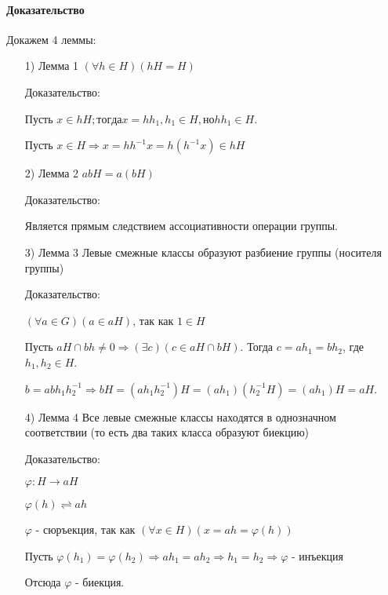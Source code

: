 \documentclass{report}
\begin{document}
\paragraph*{Доказательство}
Докажем 4 леммы:
\begin{itemize}
    \item[1)] Лемма 1\newline
        $(\forall h \in H)(hH = H)$

        Доказательство:

        Пусть $x \in hH; тогда x = hh_1, h_1 \in H, но hh_1 \in H$.

        Пусть $x \in H \Rightarrow x = hh^{-1}x = h(h^{-1}x) \in hH$
    \item[2)] Лемма 2\newline
        $abH = a(bH)$

        Доказательство:

        Является прямым следствием ассоциативности операции группы.
    \item[3)] Лемма 3\newline
        Левые смежные классы образуют разбиение группы (носителя группы)

        Доказательство:

        $(\forall a \in G)(a \in aH)$, так как $1 \in H$

        Пусть $aH \cap bh \neq 0 \Rightarrow (\exists c)(c \in aH \cap bH)$. Тогда
        $c = ah_1 = bh_2$, где $h_1,h_2 \in H$.

        $b = abh_1h^{-1}_2 \Rightarrow bH = (ah_1 h^{-1}_2)H = (ah_1)(h^{-1}_2 H) = (ah_1)H = aH$.
    \item[4)] Лемма 4\newline
        Все левые смежные классы находятся в однозначном соответствии (то есть два таких класса образуют биекцию)

        Доказательство:

        $\varphi: H \to aH$

        $\varphi(h) \rightleftharpoons ah$

        $\varphi$ - сюръекция, так как $(\forall x \in H)(x = ah = \varphi(h))$

        Пусть $\varphi(h_1) = \varphi(h_2) \Rightarrow ah_1 = ah_2 \Rightarrow h_1 = h_2 \Rightarrow \varphi$ - инъекция

        Отсюда $\varphi$ - биекция.
\end{itemize}

\newpage
\end{document}
